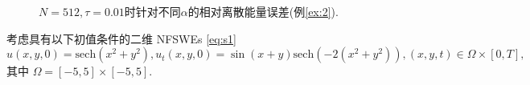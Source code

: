 \begin{figure}[H]
\begin{center}
  \caption{$N = 512,\tau=0.01$时针对不同$\alpha$的相对离散能量误差(例\ref{ex:2}).} \label{fig:6}
\end{center}
\end{figure}



\begin{example}\label{ex:4}
考虑具有以下初值条件的二维 NFSWEs \eqref{eq:s1} 
\begin{equation}\label{eq_110}
u(x,y, 0)=\mbox{sech}\left(x^2+y^2\right), u_t(x,y, 0)=\sin (x+y) \mbox{sech}\left(-2(x^2+y^2)\right), (x,y,t)\in  \Omega\times[0, T],
\end{equation}
其中 $\Omega=[-5,5] \times[-5,5]$.
\end{example}



